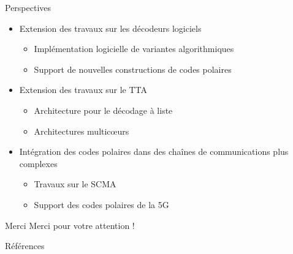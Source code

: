 \begin{frame}[c]{Perspectives}

  \begin{itemize}
    \renewcommand*{\bibfont}{\scriptsize}
    \vfill
    \item<+-> Extension des travaux sur les décodeurs logiciels
    \begin{itemize}
      \item Implémentation logicielle de variantes algorithmiques
      \item Support de nouvelles constructions de codes polaires
    \end{itemize}
    \vfill
    \item<+-> Extension des travaux sur le TTA
    \begin{itemize}
      \item Architecture pour le décodage à liste
      \item Architectures multicœurs
    \end{itemize}
    \vfill
    \item<+-> Intégration des codes polaires dans des chaînes de communications plus complexes
    \begin{itemize}
      \item Travaux sur le SCMA
      \item Support des codes polaires de la 5G
    \end{itemize}
    \vfill
  \end{itemize}

\end{frame}

\begin{frame}[c]{Merci}
\vfill
\centering
Merci pour votre attention !
\vfill
\end{frame}

\begin{frame}[allowframebreaks]{Références}
\renewcommand*{\bibfont}{\scriptsize}

\printbibliography
\end{frame}
